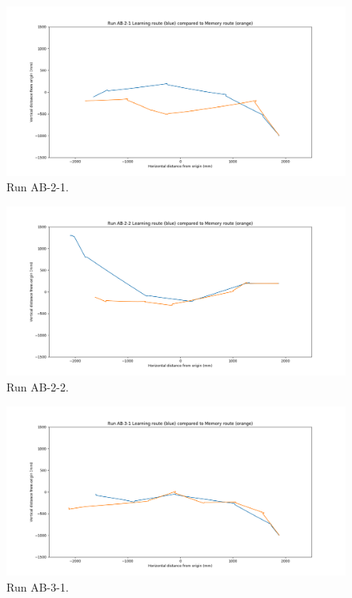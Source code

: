 \documentclass[a4paper,12pt,twoside,openright]{article}
\begin{document}
\begin{figure}[h!]
 \centering
  \includegraphics[width=\textwidth]{AB-2-1}
  \caption{
    \label{fig:ab-2-1} Run AB-2-1.
  }
\end{figure}

\begin{figure}[h!]
 \centering
  \includegraphics[width=\textwidth]{AB-2-2}
  \caption{
    \label{fig:ab-2-2} Run AB-2-2.
  }
\end{figure}

\begin{figure}[h!]
 \centering
  \includegraphics[width=\textwidth]{AB-3-1}
  \caption{
    \label{fig:ab-3-1} Run AB-3-1.
  }
\end{figure}
\end{document}
